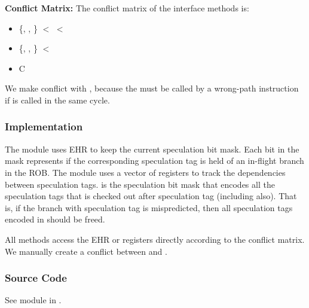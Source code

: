 \noindent\textbf{Conflict Matrix:}
The conflict matrix of the interface methods is:
\begin{itemize}
    \item \{, , \} $<$  $<$ 
    \item \{, , \} $<$ 
    \item {} C 
\end{itemize}
We make  conflict with , because the  must be called by a wrong-path instruction if  is called in the same cycle.

\subsubsection{Implementation}
The module uses EHR  to keep the current speculation bit mask.
Each bit in the mask represents if the corresponding speculation tag is held of an in-flight branch in the ROB.
The module uses a vector of registers  to track the dependencies between speculation tags.
 is the speculation bit mask that encodes all the speculation tags that is checked out after speculation tag  (including  also).
That is, if the branch with speculation tag  is mispredicted, then all speculation tags encoded in  should be freed.

All methods access the EHR or registers directly according to the conflict matrix.
We manually create a conflict between  and .

\subsubsection{Source Code}
See module  in .
